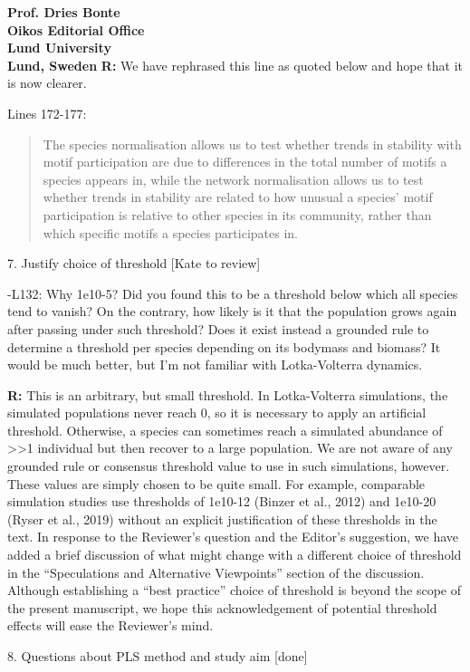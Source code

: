 \documentclass[12pt]{letter}
\begin{document}
\begin{letter}{\bf Prof. Dries Bonte\\
Oikos Editorial Office \\
Lund University \\
Lund, Sweden}
      \textbf{R:} We have rephrased this line as quoted below and hope that it is now clearer.

    
        Lines 172-177:
        
        \begin{quotation}
    		The species normalisation allows us to test whether trends in stability with motif participation are due to differences in the total number of motifs a species appears in, while the network normalisation allows us to test whether trends in stability are related to how unusual a species' motif participation is relative to other species in its community, rather than which specific motifs a species participates in.
        \end{quotation}


    7. Justify choice of threshold [Kate to review]

        -L132: Why 1e10-5? Did you found this to be a threshold below which all species tend to vanish? On the contrary, how likely is it that the population grows again after passing under such threshold? Does it exist instead a grounded rule to determine a threshold per species depending on its bodymass and biomass? It would be much better, but I’m not familiar with Lotka-Volterra dynamics.

        \textbf{R:} This is an arbitrary, but small threshold. In Lotka-Volterra simulations, the simulated populations never reach 0, so it is necessary to apply an artificial threshold. Otherwise, a species can sometimes reach a simulated abundance of >>1 individual but then recover to a large population.
        We are not aware of any grounded rule or consensus threshold value to use in such simulations, however. These values are simply chosen to be quite small. For example, comparable simulation studies use thresholds of 1e10-12 (Binzer et al., 2012) and 1e10-20 (Ryser et al., 2019) without an explicit justification of these thresholds in the text. 
        In response to the Reviewer's question and the Editor's suggestion, we have added a brief discussion of what might change with a different choice of threshold in the ``Speculations and Alternative Viewpoints'' section of the discussion. 
        Although establishing a ``best practice'' choice of threshold is beyond the scope of the present manuscript, we hope this acknowledgement of potential threshold effects will ease the Reviewer's mind.
        

    8. Questions about PLS method and study aim [done]


\end{letter}
\end{document}
